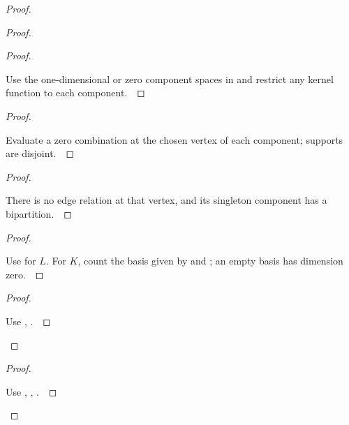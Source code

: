 \documentclass[11pt]{amsart}
\let\qed\relax
\theoremstyle{definition}
\begin{document}
\begin{proof}
\begin{proof}
\begin{proof}
\pf\ \raggedright Use the one-dimensional or zero component spaces in  and restrict any kernel function to each component.~\qed
\end{proof}
\begin{proof}
\pf\ \raggedright Evaluate a zero combination at the chosen vertex of each component; supports are disjoint.~\qed
\end{proof}
\begin{proof}
\pf\ \raggedright There is no edge relation at that vertex, and its singleton component has a bipartition.~\qed
\end{proof}
\begin{proof}
\pf\ \raggedright Use  for $L$. For $K$, count the basis given by  and ; an empty basis has dimension zero.~\qed
\end{proof}
\qedstep
\begin{proof}
\pf\ \raggedright Use , .~\qed
\end{proof}
\end{proof}
\qedstep
\begin{proof}
\pf\ \raggedright Use , , .~\qed
\end{proof}
\end{proof}
\end{document}
